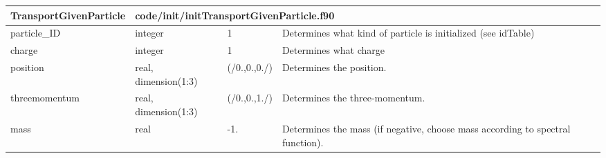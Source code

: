 \documentclass{article}
\begin{document}
\begin{longtable}{llll}
\toprule
\textbf{\large{TransportGivenParticle}} & \multicolumn{3}{l}{\footnotesize{code/init/initTransportGivenParticle.f90}}\\*
\midrule
\endfirsthead
\midrule
\endhead
particle\_ID & \begin{minipage}[t]{2cm}integer\end{minipage} & \begin{minipage}[t]{2cm}1\end{minipage} & \begin{minipage}[t]{12cm}Determines what kind of particle is initialized (see idTable)\end{minipage}\\*
\midrule
charge & \begin{minipage}[t]{2cm}integer\end{minipage} & \begin{minipage}[t]{2cm}1\end{minipage} & \begin{minipage}[t]{12cm}Determines what charge\end{minipage}\\*
\midrule
position & \begin{minipage}[t]{2cm}real, dimension(1:3)\end{minipage} & \begin{minipage}[t]{2cm}(/0.,0.,0./)\end{minipage} & \begin{minipage}[t]{12cm}Determines the position.\end{minipage}\\*
\midrule
threemomentum & \begin{minipage}[t]{2cm}real, dimension(1:3)\end{minipage} & \begin{minipage}[t]{2cm}(/0.,0.,1./)\end{minipage} & \begin{minipage}[t]{12cm}Determines the three-momentum.\end{minipage}\\*
\midrule
mass & \begin{minipage}[t]{2cm}real\end{minipage} & \begin{minipage}[t]{2cm}-1.\end{minipage} & \begin{minipage}[t]{12cm}Determines the mass (if negative, choose mass according to spectral function).\end{minipage}\\*

\end{longtable}
\end{document}
